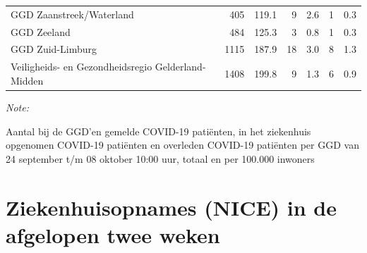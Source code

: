 \documentclass[
  english,
  man,floatsintext]{apa6}
\begin{document}
\begin{table}
\begin{threeparttable}
\begin{tabular}{lrrrrrr}
GGD Zaanstreek/Waterland & 405 & 119.1 & 9 & 2.6 & 1 & 0.3\\
GGD Zeeland & 484 & 125.3 & 3 & 0.8 & 1 & 0.3\\
GGD Zuid-Limburg & 1115 & 187.9 & 18 & 3.0 & 8 & 1.3\\
Veiligheids- en Gezondheidsregio Gelderland-Midden & 1408 & 199.8 & 9 & 1.3 & 6 & 0.9\\
\bottomrule
\end{tabular}
\begin{tablenotes}
\item \textit{Note: } 
\item Aantal bij de GGD’en gemelde COVID-19 patiënten, in het ziekenhuis opgenomen COVID-19 patiënten en overleden COVID-19 patiënten per GGD van 24 september t/m 08 oktober 10:00 uur, totaal en per 100.000 inwoners
\end{tablenotes}
\end{threeparttable}
\endgroup{}
\end{table}

\newpage

\hypertarget{ziekenhuisopnames-nice-in-de-afgelopen-twee-weken}{%
\section{Ziekenhuisopnames (NICE) in de afgelopen twee weken}\label{ziekenhuisopnames-nice-in-de-afgelopen-twee-weken}}
\end{document}
